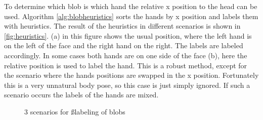 To determine which blob is which hand the relative x position to the head can be used. Algorithm \autoref{alg:blobheuristics} sorts the hands by x position and labels them with heuristics. The result of the heuristics in different scenarios is shown in \autoref{fig:heuristics}. (a) in this figure shows the usual position, where the left hand is on the left of the face and the right hand on the right. The labels are labeled accordingly. In some cases both hands are on one side of the face (b), here the relative position is used to label the hand. This is a robust method, except for the scenario where the hands positions are swapped in the x position. Fortunately this is a very unnatural body pose, so this case is just simply ignored. If such a scenario occurs the labels of the hands are mixed. 

\begin{figure}[tb]
\centering
\hspace{0.02\linewidth}
\hspace{0.02\linewidth}
\hspace{0.02\linewidth}
\caption{3 scenarios for ßlabeling of blobs}
\label{fig:heuristics}
\end{figure}



